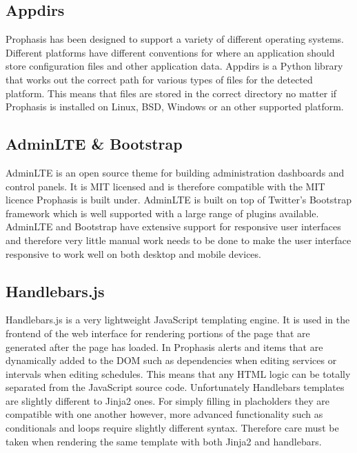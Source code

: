 \documentclass[bsc,logo,twoside,parskip,singlespacing,notimes]{infthesis}
\begin{document}
\subsection{Appdirs}

	Prophasis has been designed to support a variety of different operating
	systems.  Different platforms have different conventions for where an
	application should store configuration files and other application data.
	Appdirs is a Python library that works out the correct path for various types
	of files for the detected platform.  This means that files are stored in the
	correct directory no matter if Prophasis is installed on Linux, BSD, Windows
	or an other supported platform.

\subsection{AdminLTE \& Bootstrap}

	AdminLTE is an open source theme for building administration dashboards and
	control panels.  It is MIT licensed and is therefore compatible with the MIT
	licence Prophasis is built under.  AdminLTE is built on top of Twitter's
	Bootstrap framework which is well supported with a large range of plugins
	available.  AdminLTE and Bootstrap have extensive support for responsive user
	interfaces and therefore very little manual work needs to be done to make the
	user interface responsive to work well on both desktop and mobile devices.

\subsection{Handlebars.js}

	Handlebars.js is a very lightweight JavaScript templating engine.  It is used
	in the frontend of the web interface for rendering portions of the page that
	are generated after the page has loaded. In Prophasis alerts and items that are
	dynamically added to the DOM such as dependencies when editing services or
	intervals when editing schedules.  This means that any HTML logic can be
	totally separated from the JavaScript source code.  Unfortunately Handlebars
	templates are slightly different to Jinja2 ones.  For simply filling in
	placholders they are compatible with one another however, more advanced
	functionality such as conditionals and loops require slightly different syntax.
	Therefore care must be taken when rendering the same template with both Jinja2
	and handlebars.
	
\end{document}
